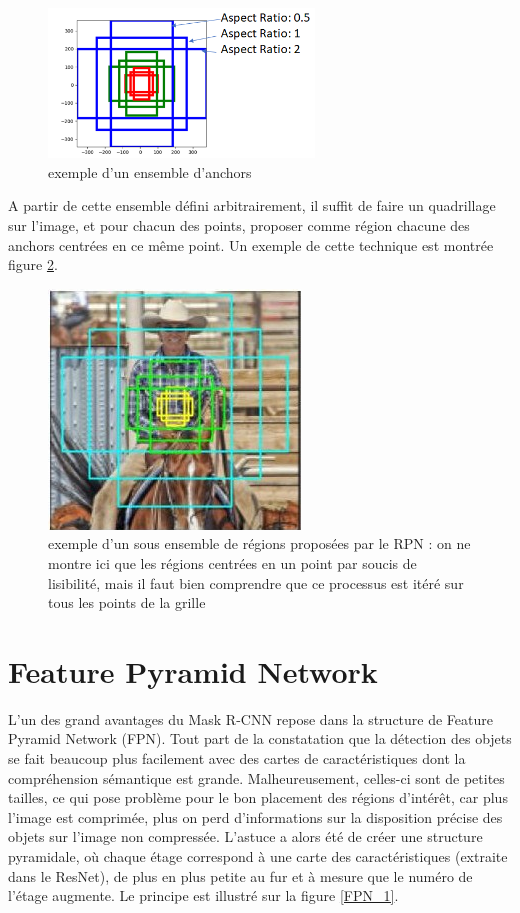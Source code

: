 \begin{figure}[!h]
\centering
\includegraphics[width=200pt]{images/Mask_R_CNN/anchors.png} 
\caption{exemple d'un ensemble d'anchors}
\label{anchors}
\end{figure}

A partir de cette ensemble défini arbitrairement, il suffit de faire un quadrillage sur l'image, et pour chacun des points, proposer comme région chacune des anchors centrées en ce même point. Un exemple de cette technique est montrée figure \ref{proposed_anchors}.

\begin{figure}[!h]
\centering
\includegraphics[width=150pts]{images/Mask_R_CNN/proposed_anchors.png} 
\caption{exemple d'un sous ensemble de régions proposées par le RPN : on ne montre ici que les régions centrées en un point par soucis de lisibilité, mais il faut bien comprendre que ce processus est itéré sur tous les points de la grille}
\label{proposed_anchors}
\end{figure}

\section{Feature Pyramid Network}

L'un des grand avantages du Mask R-CNN repose dans la structure de Feature Pyramid Network (FPN). Tout part de la constatation que la détection des objets se fait beaucoup plus facilement avec des cartes de caractéristiques dont la compréhension sémantique est grande. Malheureusement, celles-ci sont de petites tailles, ce qui pose problème pour le bon placement des régions d'intérêt, car plus l'image est comprimée, plus on perd d'informations sur la disposition précise des objets sur l'image non compressée. L'astuce a alors été de créer une structure pyramidale, où chaque étage correspond à une carte des caractéristiques (extraite dans le ResNet), de plus en plus petite au fur et à mesure que le numéro de l'étage augmente. Le principe est illustré sur la figure \ref{FPN_1}.

